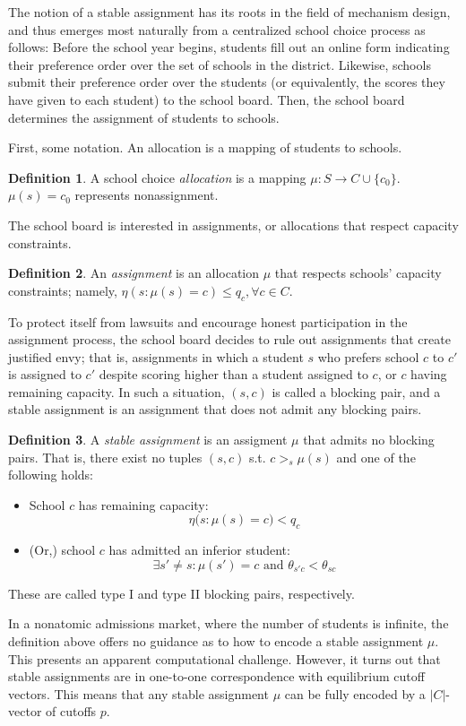 \documentclass[12pt]{article}
\theoremstyle{definition}
\newtheorem{definition}{Definition}
\begin{document}
The notion of a stable assignment has its roots in the field of mechanism design, and thus emerges most naturally from a centralized school choice process as follows: Before the school year begins, students fill out an online form indicating their preference order over the set of schools in the district. Likewise, schools submit their preference order over the students (or equivalently, the scores they have given to each student) to the school board. Then, the school board determines the assignment of students to schools.

First, some notation. An allocation is a mapping of students to schools. 
\begin{definition}
A school choice \emph{allocation} is a mapping $\mu: S \to C \cup \{c_0\}$. $\mu(s) = c_0$ represents nonassignment.
\end{definition}
The school board is interested in assignments, or allocations that respect capacity constraints. 
\begin{definition}
An \emph{assignment} is an allocation $\mu$ that respects schools' capacity constraints; namely, $\eta (s: \mu(s) = c) \leq q_c, \forall c \in C$. 
\end{definition}
To protect itself from lawsuits and encourage honest participation in the assignment process, the school board decides to rule out assignments that create justified envy; that is, assignments in which a student $s$ who prefers school $c$ to $c'$ is assigned to $c'$ despite scoring higher than a student assigned to $c$, or $c$ having remaining capacity. In such a situation, $(s, c)$ is called a blocking pair, and a stable assignment is an assignment that does not admit any blocking pairs.
\begin{definition}
A \emph{stable assignment} is an assigment $\mu$ that admits no blocking pairs. That is, there exist no tuples $(s, c)$ s.t. $c >_s \mu(s)$ and one of the following holds:
\begin{itemize}
\item School $c$ has remaining capacity:
\[\eta\bigl(s: \mu(s) = c \bigr) < q_c\]
\item (Or,) school $c$ has admitted an inferior student:
\[\exists s' \neq s: \mu(s') = c \text{ and } \theta_{s'c} < \theta_{sc}\] 
\end{itemize}
These are called type I and type II blocking pairs, respectively.
\end{definition}

In a nonatomic admissions market, where the number of students is infinite, the definition above offers no guidance as to how to encode a stable assignment $\mu$. This presents an apparent computational challenge. However, it turns out that stable assignments are in one-to-one correspondence with equilibrium cutoff vectors. This means that any stable assignment $\mu$ can be fully encoded by a $|C|$-vector of cutoffs $p$. 
\end{document}
